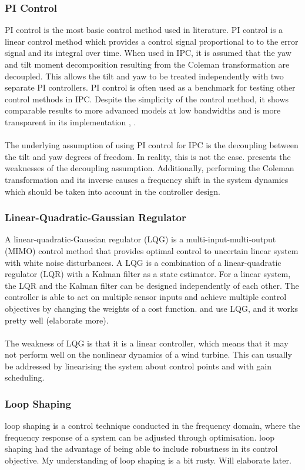 \subsubsection{PI Control}
PI control is the most basic control method used in literature. PI control is a linear control method which provides a control signal proportional to to the error signal and its integral over time. When used in IPC, it is assumed that the yaw and tilt moment decomposition resulting from the Coleman transformation are decoupled. This allows the tilt and yaw to be treated independently with two separate PI controllers. PI control is often used as a benchmark for testing other control methods in IPC. Despite the simplicity of the control method, it shows comparable results to more advanced models at low bandwidths and is more transparent in its implementation \cite{6_Mirzaei}, \cite{14_Selvam}. 
\\~\\
The underlying assumption of using PI control for IPC is the decoupling between the tilt and yaw degrees of freedom. In reality, this is not the case. \citet{1_Lu} presents the weaknesses of the decoupling assumption. Additionally, performing the Coleman transformation and its inverse causes a frequency shift in the system dynamics which should be taken into account in the controller design. 
\subsubsection{Linear-Quadratic-Gaussian Regulator}
A linear-quadratic-Gaussian regulator (LQG) is a multi-input-multi-output (MIMO) control method that provides optimal control to uncertain linear system with white noise disturbances. A LQG is a combination of a linear-quadratic regulator (LQR) with a Kalman filter as a state estimator. For a linear system, the LQR and the Kalman filter can be designed independently of each other. The controller is able to act on multiple sensor inputs and achieve multiple control objectives by changing the weights of a cost function.  \citet{14_Selvam} and \citet{5_Bossanyi} use LQG, and it works pretty well (elaborate more).
\\~\\
The weakness of LQG is that it is a linear controller, which means that it may not perform well on the nonlinear dynamics of a wind turbine. This can usually be addressed by linearising the system about control points and with gain scheduling.
\subsubsection{\hinfty Loop Shaping}
\hinfty loop shaping is a control technique conducted in the frequency domain, where the frequency response of a system can be adjusted through optimisation. \hinfty loop shaping had the advantage of being able to include robustness in its control objective. My understanding of \hinfty loop shaping is a bit rusty. Will elaborate later. 

